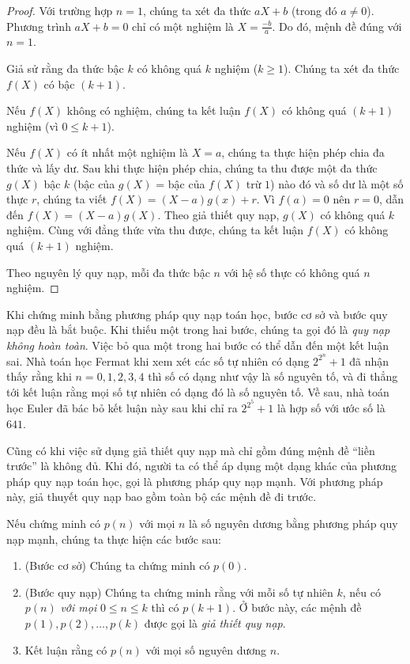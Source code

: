 \begin{proof}
    Với trường hợp $n = 1$, chúng ta xét đa thức $aX + b$ (trong đó $a\ne 0$). Phương trình $aX + b = 0$ chỉ có một nghiệm là $X = \frac{-b}{a}$. Do đó, mệnh đề đúng với $n = 1$.

    Giả sử rằng đa thức bậc $k$ có không quá $k$ nghiệm ($k\geq 1$). Chúng ta xét đa thức $f(X)$ có bậc $(k + 1)$.

    Nếu $f(X)$ không có nghiệm, chúng ta kết luận $f(X)$ có không quá $(k + 1)$ nghiệm (vì $0 \leq k + 1$).

    Nếu $f(X)$ có ít nhất một nghiệm là $X = a$, chúng ta thực hiện phép chia đa thức và lấy dư. Sau khi thực hiện phép chia, chúng ta thu được một đa thức $g(X)$ bậc $k$ (bậc của $g(X)$ = bậc của $f(X)$ trừ $1$) nào đó và số dư là một số thực $r$, chúng ta viết $f(X) = (X - a)g(x) + r$. Vì $f(a) = 0$ nên $r = 0$, dẫn đến $f(X) = (X - a)g(X)$. Theo giả thiết quy nạp, $g(X)$ có không quá $k$ nghiệm. Cùng với đẳng thức vừa thu được, chúng ta kết luận $f(X)$ có không quá $(k + 1)$ nghiệm.

    Theo nguyên lý quy nạp, mỗi đa thức bậc $n$ với hệ số thực có không quá $n$ nghiệm.
\end{proof}

Khi chứng minh bằng phương pháp quy nạp toán học, bước cơ sở và bước quy nạp đều là bắt buộc. Khi thiếu một trong hai bước, chúng ta gọi đó là \textit{quy nạp không hoàn toàn}. Việc bỏ qua một trong hai bước có thể dẫn đến một kết luận sai. Nhà toán học Fermat khi xem xét các số tự nhiên có dạng $2^{2^{n}} + 1$ đã nhận thấy rằng khi $n = 0, 1, 2, 3, 4$ thì số có dạng như vậy là số nguyên tố, và đi thẳng tới kết luận rằng mọi số tự nhiên có dạng đó là số nguyên tố. Về sau, nhà toán học Euler đã bác bỏ kết luận này sau khi chỉ ra $2^{2^{5}} + 1$ là hợp số với ước số là $641$.

Cũng có khi việc sử dụng giả thiết quy nạp mà chỉ gồm đúng mệnh đề ``liền trước'' là không đủ. Khi đó, người ta có thể áp dụng một dạng khác của phương pháp quy nạp toán học, gọi là phương pháp quy nạp mạnh. Với phương pháp này, giả thuyết quy nạp bao gồm toàn bộ các mệnh đề đi trước.

Nếu chứng minh có $p(n)$ với mọi $n$ là số nguyên dương bằng phương pháp quy nạp mạnh, chúng ta thực hiện các bước sau:
\begin{enumerate}[label={\textbf{Bước \arabic*.}},itemindent=1cm]
    \item (Bước cơ sở) Chúng ta chứng minh có $p(0)$.
    \item (Bước quy nạp) Chúng ta chứng minh rằng với mỗi số tự nhiên $k$, nếu có $p(n)$ \textit{với mọi} $0\leq n\leq k$ thì có $p(k+1)$. Ở bước này, các mệnh đề $p(1), p(2), \ldots, p(k)$ được gọi là \textit{giả thiết quy nạp}.
    \item Kết luận rằng có $p(n)$ với mọi số nguyên dương $n$.
\end{enumerate}

